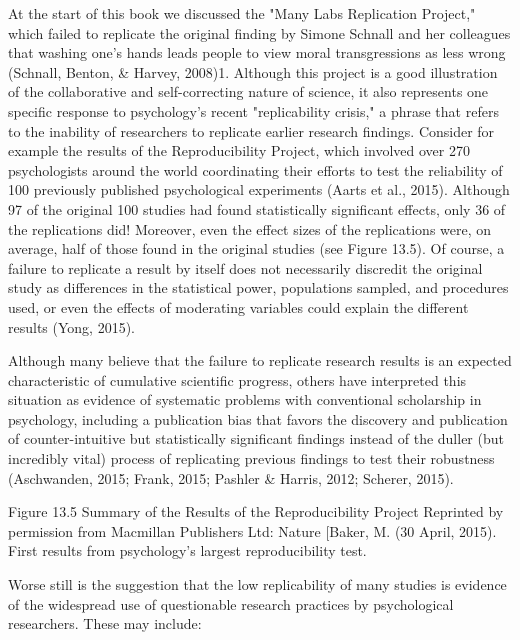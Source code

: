 At the start of this book we discussed the "Many Labs Replication Project," which failed to replicate the original finding by Simone Schnall and her colleagues that washing one's hands leads people to view moral transgressions as less wrong (Schnall, Benton, \& Harvey, 2008)1. Although this project is a good illustration of the collaborative and self-correcting nature of science, it also represents one specific response to psychology's recent "replicability crisis," a phrase that refers to the inability of researchers to replicate earlier research findings. Consider for example the results of the Reproducibility Project, which involved over 270 psychologists around the world coordinating their efforts to test the reliability of 100 previously published psychological experiments (Aarts et al., 2015). Although 97 of the original 100 studies had found statistically significant effects, only 36 of the replications did! Moreover, even the effect sizes of the replications were, on average, half of those found in the original studies (see Figure 13.5). Of course, a failure to replicate a result by itself does not necessarily discredit the original study as differences in the statistical power, populations sampled, and procedures used, or even the effects of moderating variables could explain the different results (Yong, 2015).


Although many believe that the failure to replicate research results is an expected characteristic of cumulative scientific progress, others have interpreted this situation as evidence of systematic problems with conventional scholarship in psychology, including a publication bias that favors the discovery and publication of counter-intuitive but statistically significant findings instead of the duller (but incredibly vital) process of replicating previous findings to test their robustness (Aschwanden, 2015; Frank, 2015; Pashler \& Harris, 2012; Scherer, 2015).

Figure 13.5 Summary of the Results of the Reproducibility Project Reprinted by permission from Macmillan Publishers Ltd: Nature [Baker, M. (30 April, 2015). First results from psychology's largest reproducibility test. 

Worse still is the suggestion that the low replicability of many studies is evidence of the widespread use of questionable research practices by psychological researchers. These may include:


